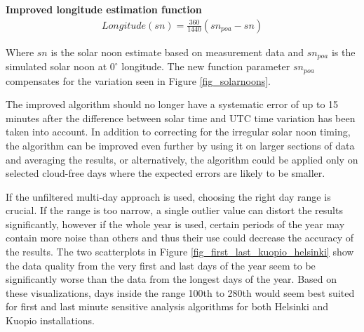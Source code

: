 \newpage
\noindent\textbf{Improved longitude estimation function }
%
\begin{equation}
\begin{split}
\label{equation_longitude_estimation_2}
Longitude(sn)= \frac{360}{1440}(sn_{poa}-sn)
\end{split}
\end{equation}

\noindent Where $sn$ is the solar noon estimate based on measurement data and $sn_{poa}$ is the simulated solar noon at $0^\circ$ longitude. The new function parameter $sn_{poa}$ compensates for the variation seen in Figure \ref{fig_solarnoons}.



\vspace{5mm}


\noindent



\vspace{0.5cm}
\noindent The improved algorithm should no longer have a systematic error of up to 15 minutes after the difference between solar time and UTC time variation has been taken into account. In addition to correcting for the irregular solar noon timing, the algorithm can be improved even further by using it on larger sections of data and averaging the results, or alternatively, the algorithm could be applied only on selected cloud-free days where the expected errors are likely to be smaller.

If the unfiltered multi-day approach is used, choosing the right day range is crucial. If the range is too narrow, a single outlier value can distort the results significantly, however if the whole year is used, certain periods of the year may contain more noise than others and thus their use could decrease the accuracy of the results. The two scatterplots in Figure \ref{fig_first_last_kuopio_helsinki} show the data quality from the very first and last days of the year seem to be significantly worse than the data from the longest days of the year. Based on these visualizations, days inside the range 100th to 280th would seem best suited for first and last minute sensitive analysis algorithms for both Helsinki and Kuopio installations.




